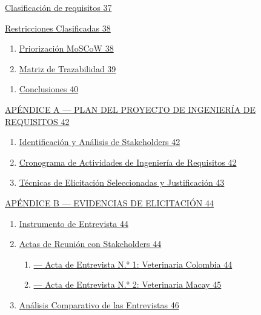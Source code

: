 \documentclass[
]{article}
\begin{document}
\hyperref[clasificaciuxf3n-de-requisitos]{Clasificación de requisitos
37}

\hyperref[_bookmark61]{Restricciones Clasificadas 38}

\begin{enumerate}
\def\labelenumi{\arabic{enumi}.}
\setcounter{enumi}{1}
\item
  \hyperref[priorizaciuxf3n-moscow]{Priorización MoSCoW 38}
\item
  \hyperref[matriz-de-trazabilidad]{Matriz de Trazabilidad 39}
\end{enumerate}

\begin{enumerate}
\def\labelenumi{\arabic{enumi}.}
\setcounter{enumi}{5}
\item
  \hyperref[conclusiones]{Conclusiones 40}
\end{enumerate}

\hyperref[apuxe9ndice-a-plan-del-proyecto-de-ingenieruxeda-de-requisitos]{APÉNDICE
A --- PLAN DEL PROYECTO DE INGENIERÍA DE REQUISITOS 42}

\begin{enumerate}
\def\labelenumi{\arabic{enumi}.}
\item
  \hyperref[identificaciuxf3n-y-anuxe1lisis-de-stakeholders]{Identificación
  y Análisis de Stakeholders 42}
\item
  \hyperref[cronograma-de-actividades-de-ingenieruxeda-de-requisitos]{Cronograma
  de Actividades de Ingeniería de Requisitos 42}
\item
  \hyperref[tuxe9cnicas-de-elicitaciuxf3n-seleccionadas-y-justificaciuxf3n]{Técnicas
  de Elicitación Seleccionadas y Justificación 43}
\end{enumerate}

\hyperref[apuxe9ndice-b-evidencias-de-elicitaciuxf3n]{APÉNDICE B ---
EVIDENCIAS DE ELICITACIÓN 44}

\begin{enumerate}
\def\labelenumi{\arabic{enumi}.}
\item
  \hyperref[instrumento-de-entrevista]{Instrumento de Entrevista 44}
\item
  \hyperref[_bookmark77]{Actas de Reunión con Stakeholders 44}

  \begin{enumerate}
  \def\labelenumii{\arabic{enumii}.}
  \item
    \hyperref[_bookmark78]{--- Acta de Entrevista N.° 1: Veterinaria
    Colombia 44}
  \item
    \hyperref[_bookmark80]{--- Acta de Entrevista N.° 2: Veterinaria
    Macay 45}
  \end{enumerate}
\item
  \hyperref[anuxe1lisis-comparativo-de-las-entrevistas]{Análisis
  Comparativo de las Entrevistas 46}
\end{enumerate}
\end{document}
